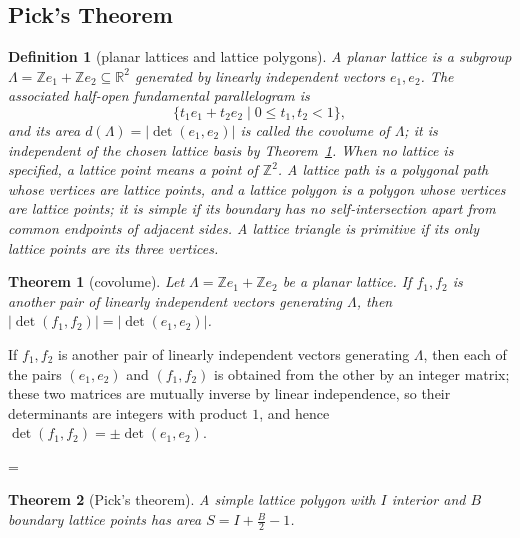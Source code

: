 \documentclass[11pt]{article}
\makeatletter
\theoremstyle{ntstyle}
\newtheorem{theorem}{Theorem}[subsection]
\newtheorem{definition}{Definition}[subsection]
\let\nt@closedisplay\]
\def\nt@guardedclose{\@ifnextchar\par{\nt@closeafterpar}{\@ifnextchar\end{\postdisplaypenalty\@M\nt@closedisplay}{\nt@closedisplay}}}
\def\nt@closeafterpar\par{\@ifnextchar\par{\nt@closeafterpar}{\@ifnextchar\end{\postdisplaypenalty\@M\nt@closedisplay\par}{\nt@closedisplay\par}}}
\renewenvironment{proof}[1][\proofname]{\par
  \pushQED{\qed}\normalfont\topsep\medskipamount\edef\nt@afterproof{\@endparpenalty=\the\@endparpenalty\relax}\@beginparpenalty\@M\@endparpenalty\@M\let\]\nt@guardedclose\trivlist\item[]\textit{#1\@addpunct{.}} \ignorespaces}{\ifvmode\addpenalty\@M\fi\popQED\nt@afterproof\endtrivlist\@endpefalse}
\makeatother
\begin{document}
\subsection{Pick's Theorem}

\begin{definition}[planar lattices and lattice polygons]\label{def:10.8.1}
	A planar lattice is a subgroup
	$\Lambda=\mathbb{Z}e_1+\mathbb{Z}e_2\subseteq\mathbb{R}^2$ generated by
	linearly independent vectors $e_1,e_2$. The associated half-open
	fundamental parallelogram is
	\[
		\{t_1e_1+t_2e_2\mid 0\le t_1,t_2<1\},
	\]
	and its area $d(\Lambda)=|\det(e_1,e_2)|$ is called the covolume of
	$\Lambda$; it is independent of the chosen lattice basis by
	Theorem~\ref{thm:10.8.1}. When no lattice
	is specified, a lattice point means a point of $\mathbb{Z}^2$. A lattice
	path is a polygonal path whose vertices are lattice points, and a lattice
	polygon is a polygon whose vertices are lattice points; it is simple if
	its boundary has no self-intersection apart from common endpoints of
	adjacent sides. A lattice triangle is primitive if its only lattice
	points are its three vertices.

\end{definition}
\begin{theorem}[covolume]\label{thm:10.8.1}
	Let $\Lambda=\mathbb{Z}e_1+\mathbb{Z}e_2$ be a planar lattice. If $f_1,f_2$ is
	another pair of linearly independent vectors generating $\Lambda$, then
	$|\det(f_1,f_2)|=|\det(e_1,e_2)|$.

\end{theorem}

\begin{proof} If $f_1,f_2$ is
	another pair of linearly independent vectors generating $\Lambda$, then
	each of the pairs $(e_1,e_2)$ and $(f_1,f_2)$ is obtained from the other
	by an integer matrix; these two matrices are mutually inverse by linear
	independence, so their determinants are integers with product $1$, and
	hence $\det(f_1,f_2)=\pm\det(e_1,e_2)$.

\end{proof}
\begin{theorem}[Pick's theorem]\label{thm:10.8.2} A simple lattice polygon
	with $I$ interior and $B$ boundary lattice points has area $S = I +
		\tfrac{B}{2} - 1$.

\end{theorem}
\end{document}
